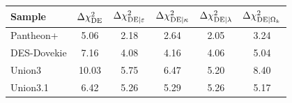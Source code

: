 \begin{tabular}{lccccc}
\hline\hline
Sample & $\Delta\chi^2_{\rm DE}$ & $\Delta\chi^2_{{\rm DE}|\varepsilon}$ & $\Delta\chi^2_{{\rm DE}|\kappa}$ & $\Delta\chi^2_{{\rm DE}|\lambda}$ & $\Delta\chi^2_{{\rm DE}|\Omega_k}$ \\
\hline
Pantheon+ & 5.06 & 2.18 & 2.64 & 2.05 & 3.24 \\
DES-Dovekie & 7.16 & 4.08 & 4.16 & 4.06 & 5.04 \\
Union3 & 10.03 & 5.75 & 6.47 & 5.20 & 8.40 \\
Union3.1 & 6.42 & 5.26 & 5.29 & 5.26 & 5.17 \\
\hline\hline
\end{tabular}
